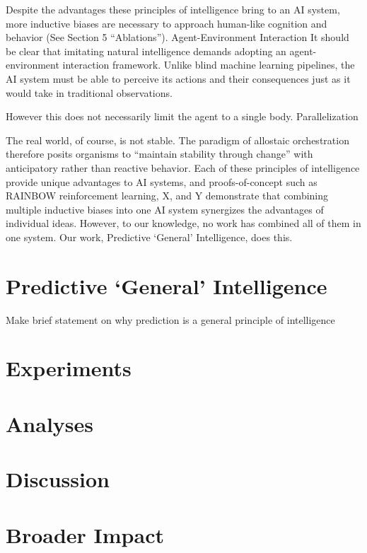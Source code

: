 \documentclass{article}
\begin{document}
Despite the advantages these principles of intelligence bring to an AI system, more inductive biases are necessary to approach human-like cognition and behavior (See Section 5 “Ablations”).
Agent-Environment Interaction
It should be clear that imitating natural intelligence demands adopting an agent-environment interaction framework. Unlike blind machine learning pipelines, the AI system must be able to perceive its actions and their consequences just as it would take in traditional observations. 

However this does not necessarily limit the agent to a single body. Parallelization

The real world, of course, is not stable. The paradigm of allostaic orchestration therefore posits organisms to ``maintain stability through change'' with anticipatory rather than reactive behavior. 
Each of these principles of intelligence provide unique advantages to AI systems, and proofs-of-concept such as RAINBOW reinforcement learning, X, and Y demonstrate that combining multiple inductive biases into one AI system synergizes the advantages of individual ideas. However, to our knowledge, no work has combined all of them in one system. Our work, Predictive ‘General’ Intelligence, does this.

\section{Predictive ‘General’ Intelligence}

Make brief statement on why prediction is a general principle of intelligence

\section{Experiments}

\section{Analyses}

\section{Discussion}



\section*{Broader Impact}
\end{document}
